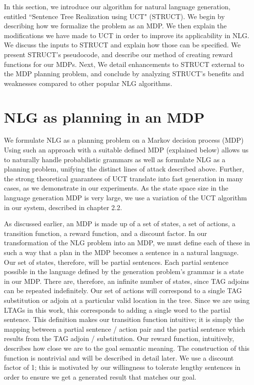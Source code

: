 In this section, we introduce our algorithm for natural language generation,
entitled ``Sentence Tree Realization using UCT" (STRUCT).  We begin
by describing how we formalize the problem as an MDP.  We then explain
the modifications we have made to UCT in order to improve
its applicability in NLG.  We discuss the inputs to STRUCT and explain
how those can be specified.  We present STRUCT's pseudocode, and describe
our method of creating reward functions for our MDPs.  Next, We detail enhancements
to STRUCT external to the MDP planning problem, and conclude by analyzing
STRUCT's benefits and weaknesses compared to other popular
NLG algorithms.

\section{NLG as planning in an MDP}
We formulate NLG as a planning problem on a Markov decision process
(MDP)  Using such an approach with a suitable defined MDP
(explained below) allows us to naturally handle
probabilistic grammars as well as formulate NLG as a planning problem,
unifying the distinct lines of attack described above. Further, the
strong theoretical guarantees of UCT translate into fast generation in
many cases, as we demonstrate in our experiments.
As the state space size in the language generation MDP is
very large, we use a variation of the UCT algorithm in our system,
described in chapter 2.2.

As discussed earlier, an MDP is made up of a set of states, a set of
actions, a transition function, a reward function, and a discount factor.
In our transformation of the NLG problem into an MDP, we must define
each of these in such a way that a plan in the MDP becomes a sentence
in a natural language.  Our set of states, therefore, will be partial
sentences.  Each partial sentence possible in the language defined by
the generation problem's grammar is a state in our MDP.  There are,
therefore, an infinite number of states, since TAG adjoins can be
repeated indefinitely.  Our set of actions will correspond to a single
TAG substitution or adjoin at a particular valid location in the tree.
Since we are using LTAGs in this work,
this corresponds to adding a single word to the partial sentence.
This definition makes our transition function intuitive; it is simply the
mapping between a partial sentence / action pair and the partial
sentence which results from the TAG adjoin / substitution.
Our reward function, intuitively, describes how close we are
to the goal semantic meaning.  The construction of this function
is nontrivial and will be described in detail later.  We use a
discount factor of 1; this is motivated by our willingness to tolerate
lengthy sentences in order to ensure we get a generated result
that matches our goal.

